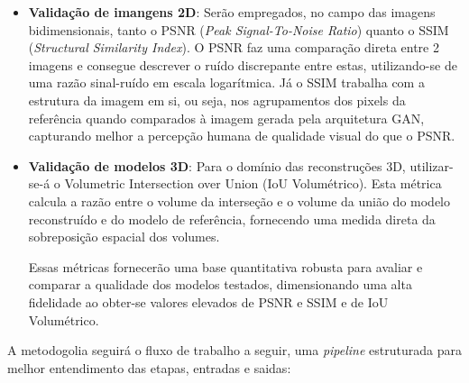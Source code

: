 \begin{itemize}

  \item \textbf{Validação de imangens 2D}: Serão empregados, no campo das imagens bidimensionais, tanto o PSNR (\textit{Peak Signal-To-Noise Ratio}) quanto o SSIM (\textit{Structural Similarity Index}). O PSNR faz uma comparação direta entre 2 imagens e consegue descrever o ruído discrepante entre estas, utilizando-se de uma razão sinal-ruído em escala logarítmica. Já o SSIM trabalha com a estrutura da imagem em si, ou seja, nos agrupamentos dos pixels da referência quando comparados à imagem gerada pela arquitetura GAN, capturando melhor a percepção humana de qualidade visual do que o PSNR.

  \item \textbf{Validação de modelos 3D}: Para o domínio das reconstruções 3D, utilizar-se-á o Volumetric Intersection over Union (IoU Volumétrico). Esta métrica calcula a razão entre o volume da interseção e o volume da união do modelo reconstruído e do modelo de referência, fornecendo uma medida direta da sobreposição espacial dos volumes.

Essas métricas fornecerão uma base quantitativa robusta para avaliar e comparar a qualidade dos modelos testados, dimensionando uma alta fidelidade ao obter-se valores elevados de PSNR e SSIM e de IoU Volumétrico.

\end{itemize}


A metodogolia seguirá o fluxo de trabalho a seguir, uma \textit{pipeline} estruturada para melhor entendimento das etapas, entradas e saidas:


